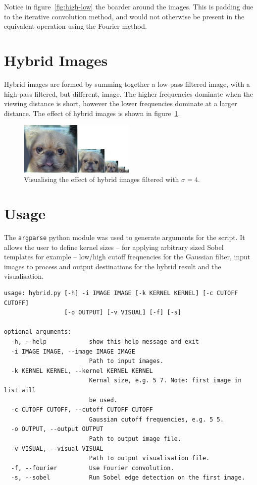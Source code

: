 \documentclass[a4paper]{article}
\begin{document}
Notice in figure~\ref{fig:high-low} the boarder around the images. This is padding due to the iterative convolution method, and would not otherwise be present in the equivalent operation using the Fourier method.

\section{Hybrid Images}
Hybrid images are formed by summing together a low-pass filtered image, with a high-pass filtered, but different, image. The higher frequencies dominate when the viewing distance is short, however the lower frequencies dominate at a larger distance. The effect of hybrid images is shown in figure~\ref{fig:visual}.

\begin{figure}[!htbp]
    \centering
    \includegraphics[width=0.5\textwidth]{../visual}
    \caption{Visualising the effect of hybrid images filtered with $\sigma=4$.}
    \label{fig:visual}
\end{figure}

\section{Usage}
The \texttt{argparse} python module was used to generate arguments for the script. It allows the user to define kernel sizes -- for applying arbitrary sized Sobel templates for example -- low/high cutoff frequencies for the Gaussian filter, input images to process and output destinations for the hybrid result and the visualisation.

\begin{verbatim}
usage: hybrid.py [-h] -i IMAGE IMAGE [-k KERNEL KERNEL] [-c CUTOFF CUTOFF]
                 [-o OUTPUT] [-v VISUAL] [-f] [-s]

optional arguments:
  -h, --help            show this help message and exit
  -i IMAGE IMAGE, --image IMAGE IMAGE
                        Path to input images.
  -k KERNEL KERNEL, --kernel KERNEL KERNEL
                        Kernal size, e.g. 5 7. Note: first image in list will
                        be used.
  -c CUTOFF CUTOFF, --cutoff CUTOFF CUTOFF
                        Gaussian cutoff frequencies, e.g. 5 5.
  -o OUTPUT, --output OUTPUT
                        Path to output image file.
  -v VISUAL, --visual VISUAL
                        Path to output visualisation file.
  -f, --fourier         Use Fourier convolution.
  -s, --sobel           Run Sobel edge detection on the first image.
\end{verbatim}
\end{document}
